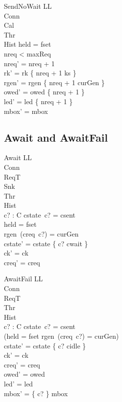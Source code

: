 \documentclass[a4paper,10pt,fleqn]{article}
\begin{document}
\begin{schema}{SendNoWait}
  \Delta LL \\
  \Xi Conn \\
  \Xi Cal \\
  \Xi Thr \\
  \Xi Hist
\where
  held = fset \\
  nreq < maxReq \\
  nreq' = nreq + 1 \\
  rk' = rk \oplus \{ nreq + 1 \mapsto ks \} \\
  rgen' = rgen \oplus \{ nreq + 1 \mapsto curGen \} \\
  owed' = owed \cup \{ nreq + 1 \} \\
  led' = led \cup \{ nreq + 1 \} \\
  mbox' = mbox
\end{schema}

\subsection{Await and AwaitFail}

\begin{schema}{Await}
  \Delta LL \\
  \Xi Conn \\
  \Xi ReqT \\
  \Xi Snk \\
  \Xi Thr \\
  \Xi Hist \\
  c? : C
\where
  cstate~c? = csent \\
  held = fset \\
  rgen~(creq~c?) = curGen \\
  cstate' = cstate \oplus \{ c? \mapsto cwait \} \\
  ck' = ck \\
  creq' = creq
\end{schema}

\begin{schema}{AwaitFail}
  \Delta LL \\
  \Xi Conn \\
  \Xi ReqT \\
  \Xi Thr \\
  \Xi Hist \\
  c? : C
\where
  cstate~c? = csent \\
  \lnot (held = fset \land rgen~(creq~c?) = curGen) \\
  cstate' = cstate \oplus \{ c? \mapsto cidle \} \\
  ck' = ck \\
  creq' = creq \\
  owed' = owed \\
  led' = led \\
  mbox' = \{ c? \} \ndres mbox
\end{schema}
\end{document}
